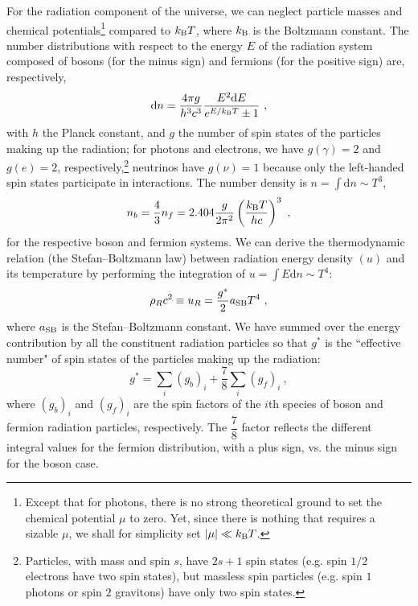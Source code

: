 \documentclass[12pt,a4paper]{article}
\newcommand{\dif}{\mathrm{d}}
\begin{document}
\cite{cheng2005relativity} For the radiation component of the universe, we can neglect particle masses and chemical potentials\footnote{Except that for photons, there is no strong theoretical ground to set the chemical potential $\mu$ to zero. Yet, since there is nothing that requires a sizable $\mu$, we shall for simplicity
set $|\mu| \ll k_{\rm B}T$.} compared to $k_{\rm B}T$, where $k_{\rm B}$ is the Boltzmann constant. The number distributions with respect to the energy $E$ of the radiation system composed of bosons (for the minus sign) and fermions (for the positive sign) are, respectively,
\begin{equation}
\dif n = \dfrac{4\pi g}{h^3 c^3} \dfrac{E^2 \dif E}{e^{E/k_{\rm B}T} \pm 1} ~,
\end{equation}
with $h$ the Planck constant, and $g$ the number of spin states of the particles making up the radiation; for photons and electrons, we have $g(\gamma) = 2$ and $g(e) = 2$, respectively,\footnote{Particles, with mass and spin $s$, have $2s +1$ spin states (e.g. spin $1/2$ electrons have two spin states), but massless spin particles (e.g. spin $1$ photons or spin $2$ gravitons) have only two spin states.}  neutrinos have $g(\nu) = 1$ because only the left-handed spin states participate in interactions. The number density is $n = \int \dif n \sim T^3$, 
\begin{equation}
n_b = \dfrac{4}{3} n_f = 2.404 \dfrac{g}{2\pi^2} \left(\dfrac{k_{\rm B}T}{hc} \right)^3 ~,
\end{equation}
for the respective boson and fermion systems. We can derive the thermodynamic relation (the Stefan–Boltzmann law) between radiation energy density $(u)$ and its temperature by performing the integration of $u = \int E \dif n \sim T^4$:
\begin{equation}
\rho_R c^2 \equiv u_R = \dfrac{g^\ast}{2} a_{\rm SB} T^4 ~,
\end{equation}
where $a_{\rm SB}$ is the Stefan–Boltzmann constant. We have summed over the energy contribution by all the constituent radiation particles so that $g^\ast$ is the ``effective number" of spin states of the particles making up the radiation:
\begin{equation}
g^\ast = \sum_i (g_b)_i +\dfrac{7}{8} \sum_i (g_f)_i ~,
\end{equation}
where $(g_b)_i$ and $(g_f)_i$ are the spin factors of the $i$th species of boson and fermion radiation particles, respectively. The $\dfrac{7}{8}$ factor reflects the different integral values for the fermion distribution, with a plus sign, vs. the minus sign for the boson case.
\end{document}

